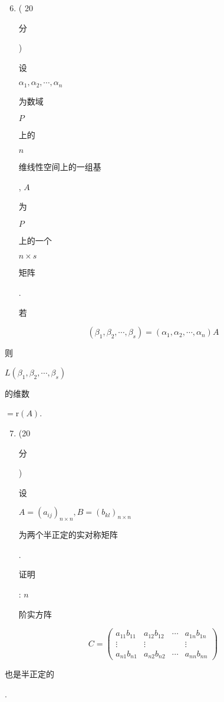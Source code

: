 \documentclass[10pt]{article}
\begin{document}
\begin{enumerate}
  \setcounter{enumi}{5}
  \item ( 20 \begin{CJK}{UTF8}{mj}分\end{CJK}) \begin{CJK}{UTF8}{mj}设\end{CJK} $\alpha_{1}, \alpha_{2}, \cdots, \alpha_{n}$ \begin{CJK}{UTF8}{mj}为数域\end{CJK} $P$ \begin{CJK}{UTF8}{mj}上的\end{CJK} $n$ \begin{CJK}{UTF8}{mj}维线性空间上的一组基\end{CJK}, $A$ \begin{CJK}{UTF8}{mj}为\end{CJK} $P$ \begin{CJK}{UTF8}{mj}上的一个\end{CJK} $n \times s$ \begin{CJK}{UTF8}{mj}矩阵\end{CJK}. \begin{CJK}{UTF8}{mj}若\end{CJK}
\end{enumerate}
$$
\left(\beta_{1}, \beta_{2}, \cdots, \beta_{s}\right)=\left(\alpha_{1}, \alpha_{2}, \cdots, \alpha_{n}\right) A
$$
\begin{CJK}{UTF8}{mj}则\end{CJK} $L\left(\beta_{1}, \beta_{2}, \cdots, \beta_{s}\right)$ \begin{CJK}{UTF8}{mj}的维数\end{CJK} $=\mathrm{r}(A)$.

\begin{enumerate}
  \setcounter{enumi}{6}
  \item (20 \begin{CJK}{UTF8}{mj}分\end{CJK}) \begin{CJK}{UTF8}{mj}设\end{CJK} $A=\left(a_{i j}\right)_{n \times n}, B=\left(b_{k l}\right)_{n \times n}$ \begin{CJK}{UTF8}{mj}为两个半正定的实对称矩阵\end{CJK}. \begin{CJK}{UTF8}{mj}证明\end{CJK}: $n$ \begin{CJK}{UTF8}{mj}阶实方阵\end{CJK}
\end{enumerate}
$$
C=\left(\begin{array}{cccc}
a_{11} b_{11} & a_{12} b_{12} & \cdots & a_{1 n} b_{1 n} \\
\vdots & \vdots & & \vdots \\
a_{n 1} b_{n 1} & a_{n 2} b_{n 2} & \cdots & a_{n n} b_{n n}
\end{array}\right)
$$
\begin{CJK}{UTF8}{mj}也是半正定的\end{CJK}.
\end{document}
